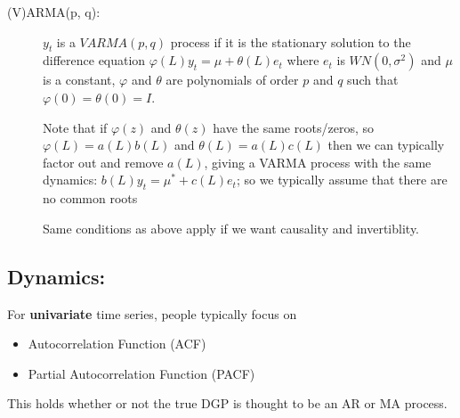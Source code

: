 \begin{description}
\item[(V)ARMA(p, q):] $y_t$ is a $VARMA(p,q)$ process if it is the
  stationary solution to the difference equation $φ(L) y_t = μ + θ(L)
  e_t$ where $e_t$ is $WN(0, σ^2)$ and $μ$ is a constant, $φ$ and $θ$
  are polynomials of order $p$ and $q$ such that $φ(0) = θ(0) = I$.

  Note that if $φ(z)$ and $θ(z)$ have the same roots/zeros, so $φ(L) =
  a(L) b(L)$ and $θ(L) = a(L) c(L)$ then we can typically factor out
  and remove $a(L)$, giving a VARMA process with the same dynamics:
  $b(L) y_t = μ^* + c(L) e_t$; so we typically assume that there are
  no common roots

  Same conditions as above apply if we want causality and
  invertiblity.
\end{description}

\subsection{Dynamics:}

For \textbf{univariate} time series, people typically focus on
\begin{itemize}
\item Autocorrelation Function (ACF)
\item Partial Autocorrelation Function (PACF)
\end{itemize}
This holds whether or not the true DGP is thought to be an AR or MA
process.

